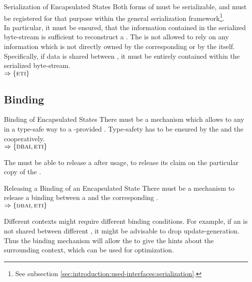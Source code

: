 \documentclass[a4paper, 12pt]{book}
\newcommand{\INTERFACE}[1]{$\Rightarrow\left\{#1\right\}$}
\begin{document}
\begin{requirement*}{Serialization of Encapsulated States}
  Both forms of  must be serializable, and must be
  registered for that purpose within the general serialization
  framework\footnote{See subsection
    \vref{sec:introduction:used-interfaces:serialization}.}.\\
  In particular, it must be ensured, that the information contained in the
  serialized byte-stream is sufficient to reconstruct a  . The 
  is not allowed to rely on any information which is not directly owned by the
  corresponding
   or by the  itself.\\
  Specifically, if data is shared between , it must be
  entirely contained within the serialized byte-stream.\\
  \INTERFACE{\ETI}
\end{requirement*}




\subsection{Binding}

\begin{requirement*}{Binding of Encapsulated States}
  There must be a mechanism which allows to  any  in a type-safe way to a -provided . Type-safety
  has to be ensured by the  and the 
  cooperatively.\\
  \INTERFACE{\DBAI,\ETI}
\end{requirement*}
%
The  must be able to release a  after usage, to
release its claim on the particular copy of the .
\begin{requirement*}{Releasing a Binding of an Encapsulated State}
  There must be a mechanism to release a binding between a  and the
  corresponding  .\\
  \INTERFACE{\DBAI,\ETI}
\end{requirement*}
%
Different contexts might require different binding conditions. For example, if
an  is not shared between different , it might be advisable to drop update-generation. Thus the
binding mechanism will allow the \SYNEIGHT to give the  hints about the surrounding context, which can be used
for optimization. 
\end{document}
